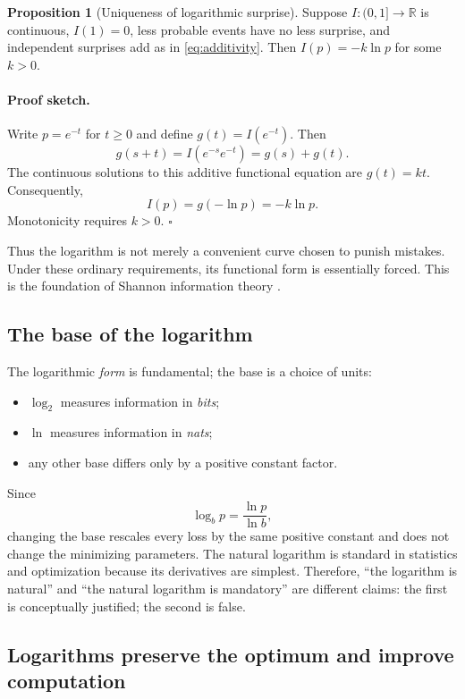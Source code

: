 \documentclass[11pt]{article}
\newcommand{\R}{\mathbb{R}}
\theoremstyle{definition}
\newtheorem{proposition}{Proposition}[section]
\begin{document}
\begin{proposition}[Uniqueness of logarithmic surprise]
Suppose $I:(0,1]\to\R$ is continuous, $I(1)=0$, less probable events have no less surprise, and independent surprises add as in \cref{eq:additivity}. Then $I(p)=-k\ln p$ for some $k>0$.
\end{proposition}

\paragraph{Proof sketch.}
Write $p=e^{-t}$ for $t\ge 0$ and define $g(t)=I(e^{-t})$. Then
\[
g(s+t)=I(e^{-s}e^{-t})=g(s)+g(t).
\]
The continuous solutions to this additive functional equation are $g(t)=kt$. Consequently,
\[
I(p)=g(-\ln p)=-k\ln p.
\]
Monotonicity requires $k>0$. \hfill$\square$

Thus the logarithm is not merely a convenient curve chosen to punish mistakes. Under these ordinary requirements, its functional form is essentially forced. This is the foundation of Shannon information theory \cite{shannon1948}.

\subsection{The base of the logarithm}

The logarithmic \emph{form} is fundamental; the base is a choice of units:
\begin{itemize}
  \item $\log_2$ measures information in \emph{bits};
  \item $\ln$ measures information in \emph{nats};
  \item any other base differs only by a positive constant factor.
\end{itemize}
Since
\[
\log_b p=\frac{\ln p}{\ln b},
\]
changing the base rescales every loss by the same positive constant and does not change the minimizing parameters. The natural logarithm is standard in statistics and optimization because its derivatives are simplest. Therefore, ``the logarithm is natural'' and ``the natural logarithm is mandatory'' are different claims: the first is conceptually justified; the second is false.

\subsection{Logarithms preserve the optimum and improve computation}
\end{document}
